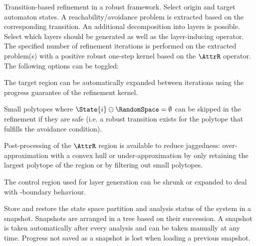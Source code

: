     \stopsubsubject

    \startsubsubject[title={Widget: Robust Transition Refinement}]

        Transition-based refinement in a robust framework.
        Select origin and target automaton states.
        A reachability/avoidance problem is extracted based on the corresponding transition.
        An additional decomposition into layers is possible.
        Select which layers should be generated as well as the layer-inducing operator.
        The specified number of refinement iterations is performed on the extracted problem(s) with a positive robust one-step kernel based on the $\AttrR$ operator.
        The following options can be toggled:

        \startitemize[packed]
            \item{The target region can be automatically expanded between iterations using the progress guarantee of the refinement kernel.}
            \item{Small polytopes where $\State{i} \ominus \RandomSpace = \emptyset$ can be skipped in the refinement if they are safe (i.e. a robust transition exists for the polytope that fulfills the avoidance condition).}
            \item{Post-processing of the $\AttrR$ region is available to reduce jaggedness: over-approximation with a convex hull or under-approximation by only retaining the largest polytope of the region or by filtering out small polytopes.}
            \item{The control region used for layer generation can be shrunk or expanded to deal with \epsilon-boundary behaviour.}
        \stopitemize

    \stopsubsubject

    \startsubsubject[title={Widget: Snapshots}]

        Store and restore the state space partition and analysis status of the system in a snapshot.
        Snapshots are arranged in a tree based on their succession.
        A snapshot is taken automatically after every analysis and can be taken manually at any time.
        Progress not saved as a snapshot is lost when loading a previous snapshot.

    \stopsubsubject

\stopsubject



